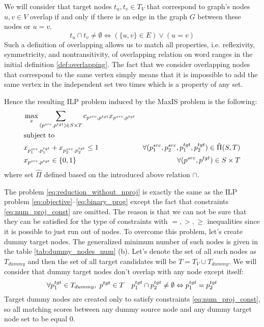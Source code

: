 We will consider that target nodes \( t_u, t_v \in T_{V} \) that correspond to graph's nodes \( u, v \in V \) overlap
if and only if there is an edge in the graph \( G \) between these nodes or \( u = v \).
\begin{equation} \label{eq:overlap_reduction}
  t_u \cap t_v \neq \emptyset \Leftrightarrow
  \left( \{ u, v \} \in E \right) \lor  \left(u = v \right)
\end{equation}
Such a definition of overlapping allows us to match all properties, i.e. reflexivity, symmetricity, and nontransitivity,
of overlapping relation on word ranges in the initial definition \ref{def:overlapping}. The fact that we consider
overlapping nodes that correspond to the same vertex simply means that it is impossible to
add the same vertex in the independent set two times which is a property of any set.

Hence the resulting ILP problem induced by the MaxIS problem is the following:
\begin{equation} \label{eq:reduction_without_nproj}
  \begin{aligned}
    & \max\limits_x \sum\limits_{(p^{src}, p^{tgt}) \in S \times T} c_{p^{src}, p^{tgt}} x_{p^{src}, p^{tgt}}                                             \\
    & \text{subject to}                                                                                                                                   \\
    & x_{p_1^{src}, p_1^{tgt}} + x_{p_2^{src}, p_2^{tgt}} \leq 1
    & \forall (p_1^{src}, p_2^{src}, p_1^{tgt}, p_2^{tgt}) \in \hat{\Pi}(S, T)                                                                            \\
    & x_{p^{src}, p^{tgt}} \in \{ 0, 1 \}                                                                     & \forall (p^{src}, p^{tgt}) \in S \times T
  \end{aligned}
\end{equation}
where set \( \hat{\Pi} \) defined based on the introduced above relation \( \cap \).

The problem \eqref{eq:reduction_without_nproj} is exactly the same as the ILP problem \eqref{eq:objective}--\eqref{eq:binary_prog}
except the fact that constraints \eqref{eq:num_proj_const} are omitted. The reason is that we can not be sure
that they can be satisfied for the type of constraints with \( =, >, \geq \) inequalities since it is possible to just run out of nodes.
To overcome this problem, let's create dummy target nodes. The generalized minimum number of such nodes is given
in the table \ref{tab:dummy_nodes_num} (b). Let's denote the set of all such nodes as \( T_{dummy} \) and then the set of all target candidates
will be \( T = T_V \cup T_{dummy} \). We will consider that dummy target nodes don't overlap with any node except itself:
\[
  \forall p_1^{tgt} \in T_{dummy}, \; p^{tgt} \in T \quad
  p_1^{tgt} \cap p_2^{tgt} \neq \emptyset \Leftrightarrow p_1^{tgt} = p_2^{tgt}
\]
Target dummy nodes are created only to satisfy constraints \eqref{eq:num_proj_const}, so all matching scores
between any dummy source node and any dummy target node set to be equal \( 0 \).

